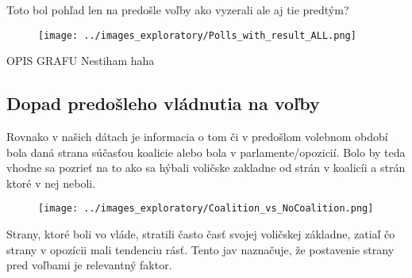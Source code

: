 \documentclass[main.tex]{subfiles}
\begin{document}
Toto bol pohľad len na predošle voľby ako vyzerali ale aj tie predtým?

\begin{figure}[h]
    \centering
    \texttt{[image: ../images\_exploratory/Polls\_with\_result\_ALL.png]}
    \caption{}
    \label{fig:example}
\end{figure}

OPIS GRAFU Nestiham haha

\subsection{Dopad predošleho vládnutia na voľby}

Rovnako v našich dátach je informacia o tom či v predošlom volebnom období bola daná strana súčasťou koalicie alebo bola v parlamente/opozicií. Bolo by teda vhodne sa pozrieť na to ako sa hýbali voličske zakladne od strán v koalicíi a strán ktoré v nej neboli. 
\begin{figure}[h]
    \centering
    \texttt{[image: ../images\_exploratory/Coalition\_vs\_NoCoalition.png]}
    \caption{}
    \label{fig:example}
\end{figure}
Strany, ktoré boli vo vláde, stratili často časť svojej voličskej základne, zatiaľ čo strany v opozícii mali tendenciu rásť. Tento jav naznačuje, že postavenie strany pred voľbami je relevantný faktor.
\end{document}
